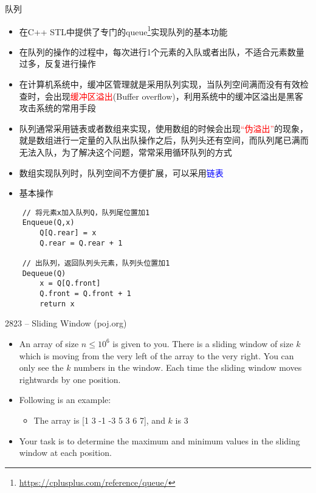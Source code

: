 \begin{frame}{队列}
    \begin{itemize}
        \item 在C++ STL中提供了专门的queue\footnote{\url{https://cplusplus.com/reference/queue/}}实现队列的基本功能
        \item 在队列的操作的过程中，每次进行1个元素的入队或者出队，不适合元素数量过多，反复进行操作
        \item 在计算机系统中，缓冲区管理就是采用队列实现，当队列空间满而没有有效检查时，会出现\textcolor{red}{缓冲区溢出}(Buffer overflow)，利用系统中的缓冲区溢出是黑客攻击系统的常用手段
        \item 队列通常采用链表或者数组来实现，使用数组的时候会出现\textcolor{red}{“伪溢出”}的现象，就是数组进行一定量的入队出队操作之后，队列头还有空间，而队列尾已满而无法入队，为了解决这个问题，常常采用循环队列的方式
        \item 数组实现队列时，队列空间不方便扩展，可以采用\textcolor{blue}{链表}
    \end{itemize}
\end{frame}    
\vspace*{8ex}
\begin{itemize}
    \item[] \Large{基本操作}
\end{itemize}
\begin{lstlisting}
    // 将元素x加入队列Q，队列尾位置加1
    Enqueue(Q,x)
        Q[Q.rear] = x
        Q.rear = Q.rear + 1
        
    // 出队列，返回队列头元素，队列头位置加1
    Dequeue(Q)
        x = Q[Q.front]
        Q.front = Q.front + 1
        return x
\end{lstlisting}
\begin{frame}{2823 -- Sliding Window (poj.org)}
    \begin{itemize}
        \item An array of size $n\leqslant10^6$ is given to you. There is a sliding window of size $k$ which is moving from the very left of the array to the very right. You can only see the $k$ numbers in the window. Each time the sliding window moves rightwards by one position. 
        \vfill
        \item Following is an example:
        \begin{itemize}
            \item The array is [1 3 -1 -3 5 3 6 7], and $k$ is 3
        \end{itemize}
        \vfill
        \item Your task is to determine the maximum and minimum values in the sliding window at each position.
    \end{itemize}
\end{frame}

